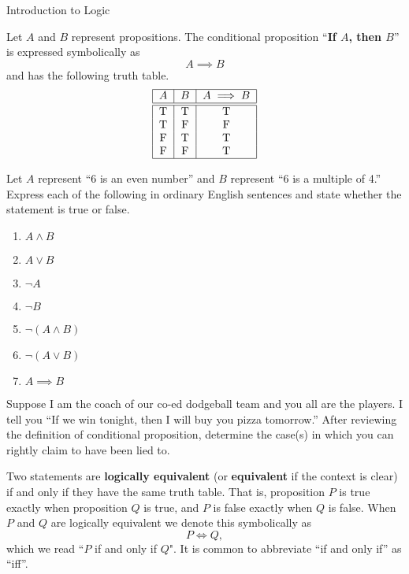 \begin{section}{Introduction to Logic}
\begin{definition}\label{def:conditional}
Let $A$ and $B$ represent propositions.  The conditional proposition ``\textbf{If $A$, then $B$}'' is expressed symbolically as 
\[
A \implies B
\]
and has the following truth table.
\[
\begin{tabular}{| c | c  | c |} \hline
$A$  &  $B$ & $A \implies B$  \\ \hline\hline
T & T & T  \\ 
T & F & F  \\ 
F & T & T  \\ 
F & F & T  \\ \hline
\end{tabular}
\]
\end{definition}

\begin{exercise}\label{exer:translations}
Let $A$ represent ``6 is an even number'' and $B$ represent ``6 is a multiple of 4.''  Express each of the following in ordinary English sentences and state whether the statement is true or false.
\begin{enumerate}
  \item $A \wedge B$
  \item $A \vee B$
  \item $\neg A$
  \item $\neg B$
  \item $\neg (A \wedge B)$
  \item $\neg (A \vee B)$
  \item $A \implies B$
\end{enumerate}
\end{exercise}

\begin{problem}
Suppose I am the coach of our co-ed dodgeball team and you all are the players.  I tell you ``If we win tonight, then I will buy you pizza tomorrow.''  After reviewing the definition of conditional proposition, determine the case(s) in which you can rightly claim to have been lied to.
\end{problem}

\begin{definition}
Two statements are \textbf{logically equivalent} (or \textbf{equivalent} if the context is clear) if and only if they have the same truth table.  That is, proposition $P$ is true exactly when proposition $Q$ is true, and $P$ is false exactly when $Q$ is false.  When $P$ and $Q$ are logically equivalent we denote this symbolically as 
\[
P \iff Q,
\]
which we read ``$P$ if and only if $Q$".  It is common to abbreviate ``if and only if'' as ``iff''.
\end{definition}


\end{section}
